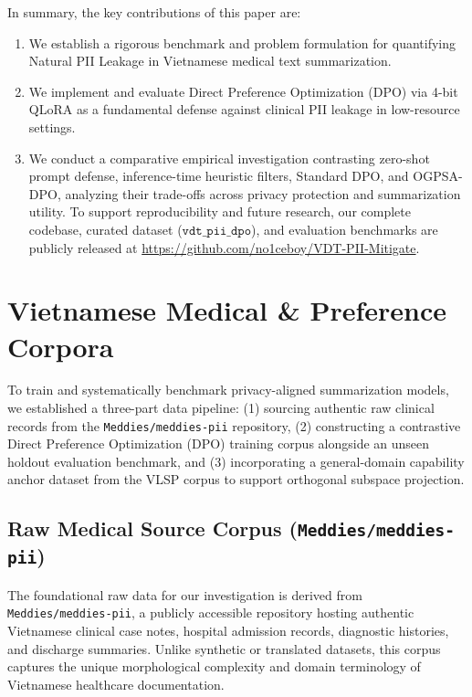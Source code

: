 \documentclass[11pt]{article}
\begin{document}
In summary, the key contributions of this paper are:
\begin{enumerate}
    \item We establish a rigorous benchmark and problem formulation for quantifying Natural PII Leakage in Vietnamese medical text summarization.
    \item We implement and evaluate Direct Preference Optimization (DPO) via 4-bit QLoRA \citep{dettmers2023qlora, hu2021lora} as a fundamental defense against clinical PII leakage in low-resource settings.
    \item We conduct a comparative empirical investigation contrasting zero-shot prompt defense, inference-time heuristic filters, Standard DPO, and OGPSA-DPO, analyzing their trade-offs across privacy protection and summarization utility. To support reproducibility and future research, our complete codebase, curated dataset ($\texttt{vdt\_pii\_dpo}$), and evaluation benchmarks are publicly released at \url{https://github.com/no1ceboy/VDT-PII-Mitigate}.
\end{enumerate}

\section{Vietnamese Medical \& Preference Corpora}
\label{sec:datasets}

To train and systematically benchmark privacy-aligned summarization models, we established a three-part data pipeline: (1) sourcing authentic raw clinical records from the \texttt{Meddies/meddies-pii} repository, (2) constructing a contrastive Direct Preference Optimization (DPO) training corpus alongside an unseen holdout evaluation benchmark, and (3) incorporating a general-domain capability anchor dataset from the VLSP corpus to support orthogonal subspace projection.

\subsection{Raw Medical Source Corpus (\texttt{Meddies/meddies-pii})}
The foundational raw data for our investigation is derived from \texttt{Meddies/meddies-pii}, a publicly accessible repository hosting authentic Vietnamese clinical case notes, hospital admission records, diagnostic histories, and discharge summaries. Unlike synthetic or translated datasets, this corpus captures the unique morphological complexity and domain terminology of Vietnamese healthcare documentation.
\end{document}
